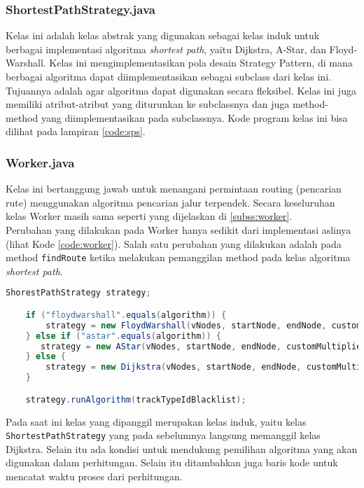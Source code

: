 \subsubsection{ShortestPathStrategy.java}
Kelas ini adalah kelas abstrak yang digunakan sebagai kelas induk untuk berbagai implementasi algoritma \textit{shortest path}, yaitu Dijkstra, A-Star, dan Floyd-Warshall. Kelas ini mengimplementasikan pola desain Strategy Pattern, di mana berbagai algoritma dapat diimplementasikan sebagai subclass dari kelas ini. Tujuannya adalah agar algoritma dapat digunakan secara fleksibel. Kelas ini juga memiliki atribut-atribut yang diturunkan ke subclassnya dan juga method-method yang diimplementasikan pada subclassnya. Kode program kelas ini bisa dilihat pada lampiran \ref{code:sps}.

\subsubsection{Worker.java}
Kelas ini bertanggung jawab untuk menangani permintaan routing (pencarian rute) menggunakan algoritma pencarian jalur terpendek. Secara keseluruhan kelas Worker masih sama seperti yang dijelaskan di \ref{subss:worker}.
\\
Perubahan yang dilakukan pada Worker hanya sedikit dari implementasi aslinya (lihat Kode \ref{code:worker}). Salah satu perubahan yang dilakukan adalah pada method \texttt{findRoute} ketika melakukan pemanggilan method pada kelas algoritma \textit{shortest path}.
\begin{lstlisting}[language=Java, caption=Worker.java, basicstyle=\small\ttfamily]
    ShorestPathStrategy strategy;

    if ("floydwarshall".equals(algorithm)) {
        strategy = new FloydWarshall(vNodes, startNode, endNode, customMultiplierWalking, customPenaltyTransfer);
	} else if ("astar".equals(algorithm)) {
	   strategy = new AStar(vNodes, startNode, endNode, customMultiplierWalking, customPenaltyTransfer);
	} else {
		strategy = new Dijkstra(vNodes, startNode, endNode, customMultiplierWalking, customPenaltyTransfer);
	}

    strategy.runAlgorithm(trackTypeIdBlacklist);
\end{lstlisting}
\noindent
Pada saat ini kelas yang dipanggil merupakan kelas induk, yaitu kelas \texttt{ShortestPathStrategy} yang pada sebelumnya langsung memanggil kelas Dijkstra. Selain itu ada kondisi untuk mendukung pemilihan algoritma yang akan digunakan dalam perhitungan. Selain itu ditambahkan juga baris kode untuk mencatat waktu proses dari perhitungan.

